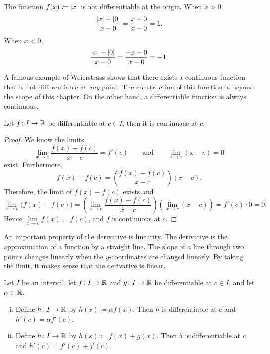 \begin{example}
The function $f(x) \coloneqq \left\lvert {x} \right\rvert$ is not differentiable
at the origin.  When $x > 0$,
\begin{equation*}
\frac{\left\lvert {x} \right\rvert-\left\lvert {0} \right\rvert}{x-0} =
\frac{x-0}{x-0} = 1 .
\end{equation*}
When $x < 0$,
\begin{equation*}
\frac{\left\lvert {x} \right\rvert-\left\lvert {0} \right\rvert}{x-0} =
\frac{-x-0}{x-0} = -1 .
\end{equation*}
\end{example}

A famous example of Weierstrass shows that there exists a continuous
function that is not differentiable at \emph{any} point.  The construction
of this function is beyond the scope of this chapter.  On the other hand,
a differentiable function is always continuous.

\begin{prop}
Let $f \colon I \to {\mathbb{R}}$ be differentiable at $c \in I$,
then it is continuous at $c$.
\end{prop}

\begin{proof}
We know the limits
\begin{equation*}
\lim_{x\to c}\frac{f(x)-f(c)}{x-c} = f'(c)
\qquad
\text{and}
\qquad
\lim_{x\to c}(x-c) = 0
\end{equation*}
exist.  Furthermore,
\begin{equation*}
f(x)-f(c) = 
\left( \frac{f(x)-f(c)}{x-c} \right) (x-c) .
\end{equation*}
Therefore, the limit of $f(x)-f(c)$ exists and
\begin{equation*}
\lim_{x\to c} \bigl( f(x)-f(c) \bigr) =
\left(\lim_{x\to c} \frac{f(x)-f(c)}{x-c} \right)
\left(\lim_{x\to c} (x-c) \right) =
f'(c) \cdot 0  = 0.
\end{equation*}
Hence $\lim\limits_{x\to c} f(x) = f(c)$, and $f$ is continuous at $c$.
\end{proof}

An important property of the derivative is linearity.  The
derivative is the approximation of a function by a straight line.
The slope of a line through two points changes linearly when the
$y$-coordinates are changed linearly.  By taking the limit,
it makes sense that the derivative is linear.

\begin{prop}[Linearity]
Let $I$ be an interval, let
$f \colon I \to {\mathbb{R}}$ and $g \colon I \to {\mathbb{R}}$ be differentiable at $c \in I$,
and let $\alpha \in {\mathbb{R}}$.
\begin{enumerate}[(i)]
\item
Define $h \colon I \to {\mathbb{R}}$ by $h(x) \coloneqq \alpha f(x)$.  Then
$h$ is differentiable at $c$ and
$h'(c) = \alpha f'(c)$.
\item
Define $h \colon I \to {\mathbb{R}}$ by $h(x) \coloneqq  f(x) + g(x)$.  Then
$h$ is differentiable at $c$ and
$h'(c) =  f'(c) + g'(c)$.
\end{enumerate}
\end{prop}


